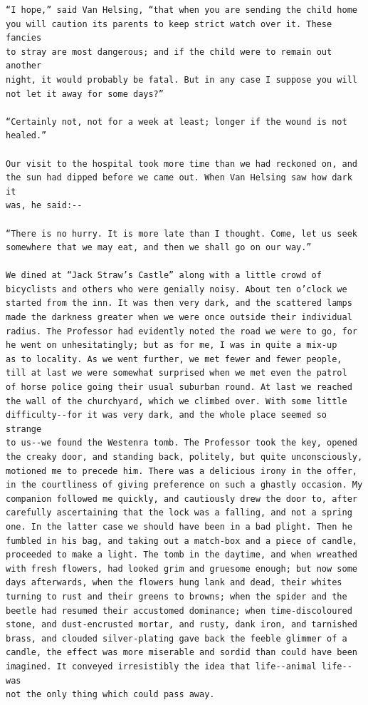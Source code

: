 \documentclass{article}
\begin{document}
\begin{verbatim}
“I hope,” said Van Helsing, “that when you are sending the child home
you will caution its parents to keep strict watch over it. These fancies
to stray are most dangerous; and if the child were to remain out another
night, it would probably be fatal. But in any case I suppose you will
not let it away for some days?”

“Certainly not, not for a week at least; longer if the wound is not
healed.”

Our visit to the hospital took more time than we had reckoned on, and
the sun had dipped before we came out. When Van Helsing saw how dark it
was, he said:--

“There is no hurry. It is more late than I thought. Come, let us seek
somewhere that we may eat, and then we shall go on our way.”

We dined at “Jack Straw’s Castle” along with a little crowd of
bicyclists and others who were genially noisy. About ten o’clock we
started from the inn. It was then very dark, and the scattered lamps
made the darkness greater when we were once outside their individual
radius. The Professor had evidently noted the road we were to go, for
he went on unhesitatingly; but as for me, I was in quite a mix-up
as to locality. As we went further, we met fewer and fewer people,
till at last we were somewhat surprised when we met even the patrol
of horse police going their usual suburban round. At last we reached
the wall of the churchyard, which we climbed over. With some little
difficulty--for it was very dark, and the whole place seemed so strange
to us--we found the Westenra tomb. The Professor took the key, opened
the creaky door, and standing back, politely, but quite unconsciously,
motioned me to precede him. There was a delicious irony in the offer,
in the courtliness of giving preference on such a ghastly occasion. My
companion followed me quickly, and cautiously drew the door to, after
carefully ascertaining that the lock was a falling, and not a spring
one. In the latter case we should have been in a bad plight. Then he
fumbled in his bag, and taking out a match-box and a piece of candle,
proceeded to make a light. The tomb in the daytime, and when wreathed
with fresh flowers, had looked grim and gruesome enough; but now some
days afterwards, when the flowers hung lank and dead, their whites
turning to rust and their greens to browns; when the spider and the
beetle had resumed their accustomed dominance; when time-discoloured
stone, and dust-encrusted mortar, and rusty, dank iron, and tarnished
brass, and clouded silver-plating gave back the feeble glimmer of a
candle, the effect was more miserable and sordid than could have been
imagined. It conveyed irresistibly the idea that life--animal life--was
not the only thing which could pass away.


\end{verbatim}
\end{document}
